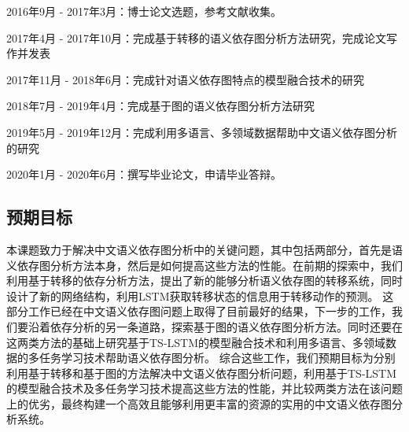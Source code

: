 2016年9月 - 2017年3月：博士论文选题，参考文献收集。

2017年4月 - 2017年10月：完成基于转移的语义依存图分析方法研究，完成论文写作并发表

2017年11月 - 2018年6月：完成针对语义依存图特点的模型融合技术的研究

2018年7月 - 2019年4月：完成基于图的语义依存图分析方法研究

2019年5月 - 2019年12月：完成利用多语言、多领域数据帮助中文语义依存图分析的研究

2020年1月 - 2020年6月：撰写毕业论文，申请毕业答辩。


\subsection{预期目标}

本课题致力于解决中文语义依存图分析中的关键问题，其中包括两部分，首先是语义依存图分析方法本身，然后是如何提高这些方法的性能。在前期的探索中，我们利用基于转移的依存分析方法，提出了新的能够分析语义依存图的转移系统，同时设计了新的网络结构，利用LSTM获取转移状态的信息用于转移动作的预测。
这部分工作已经在中文语义依存图问题上取得了目前最好的结果，下一步的工作，我们要沿着依存分析的另一条道路，探索基于图的语义依存图分析方法。同时还要在这两类方法的基础上研究基于TS-LSTM的模型融合技术和利用多语言、多领域数据的多任务学习技术帮助语义依存图分析。
综合这些工作，我们预期目标为分别利用基于转移和基于图的方法解决中文语义依存图分析问题，利用基于TS-LSTM的模型融合技术及多任务学习技术提高这些方法的性能，并比较两类方法在该问题上的优劣，最终构建一个高效且能够利用更丰富的资源的实用的中文语义依存图分析系统。

